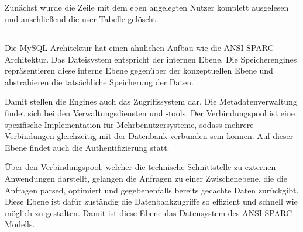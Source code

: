 \documentclass[ngerman]{gdb-aufgabenblatt}
\begin{document}
	\subsection{} %
		Zunächst wurde die Zeile mit dem eben angelegten Nutzer komplett ausgelesen und anschließend die user-Tabelle gelöscht.
	\subsection{} %
		Die MySQL-Architektur hat einen ähnlichen Aufbau wie die ANSI-SPARC Architektur. Das Dateisystem entspricht der internen Ebene. Die Speicherengines repräsentieren diese interne Ebene gegenüber der konzeptuellen Ebene und abstrahieren die tatsächliche Speicherung der Daten. 
		
		Damit stellen die Engines auch das Zugriffssystem dar. Die Metadatenverwaltung findet sich bei den Verwaltungsdiensten und -tools. Der Verbindungspool ist eine spezifische Implementation für Mehrbenutzersysteme, sodass mehrere Verbindungen gleichzeitig mit der Datenbank verbunden sein können. Auf dieser Ebene findet auch die Authentifizierung statt.
		
		Über den Verbindungspool, welcher die technische Schnittstelle zu externen Anwendungen darstellt, gelangen die Anfragen zu einer Zwischenebene, die die Anfragen parsed, optimiert und gegebenenfalls bereits gecachte Daten zurückgibt. Diese Ebene ist dafür zuständig die Datenbankzugriffe so effizient und schnell wie möglich zu gestalten. Damit ist diese Ebene das Datensystem des ANSI-SPARC Modells.
\end{document}
